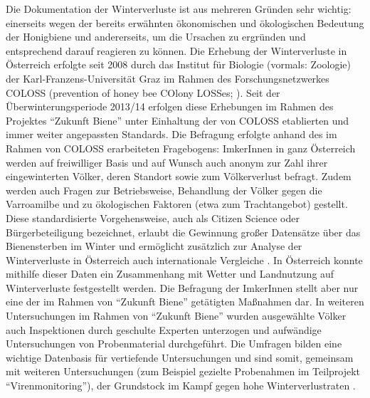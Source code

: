 Die Dokumentation der Winterverluste ist aus mehreren Gründen sehr wichtig: einerseits wegen der bereits erwähnten ökonomischen und ökologischen Bedeutung der Honigbiene und andererseits, um die Ursachen zu ergründen und entsprechend darauf reagieren zu können. Die Erhebung der Winterverluste in Österreich erfolgte seit 2008 durch das Institut für Biologie (vormals: Zoologie) der Karl-Franzens-Universität Graz im Rahmen des Forschungsnetzwerkes COLOSS (prevention of honey bee COlony LOSSes; \cite{brodschneider2010,brodschneider2013}). Seit der Überwinterungsperiode 2013/14 erfolgen diese Erhebungen im Rahmen des Projektes \enquote{Zukunft Biene} unter Einhaltung der von COLOSS etablierten und immer weiter angepassten Standards. Die Befragung erfolgte anhand des im Rahmen von COLOSS erarbeiteten Fragebogens: ImkerInnen in ganz Österreich werden auf freiwilliger Basis und auf Wunsch auch anonym zur Zahl ihrer eingewinterten Völker, deren Standort sowie zum Völkerverlust befragt. Zudem werden auch Fragen zur Betriebsweise, Behandlung der Völker gegen die Varroamilbe und zu ökologischen Faktoren (etwa zum Trachtangebot) gestellt. Diese standardisierte Vorgehensweise, auch als Citizen Science oder Bürgerbeteiligung bezeichnet, erlaubt die Gewinnung großer Datensätze über das Bienensterben im Winter und ermöglicht zusätzlich zur Analyse der Winterverluste in Österreich auch internationale Vergleiche \citep{brodschneider2016, brodschneider2018,brodschneider2019}. In Österreich konnte mithilfe dieser Daten ein Zusammenhang mit Wetter \citep{switanek2017} und Landnutzung \citep{kuchling2018} auf Winterverluste festgestellt werden. Die Befragung der ImkerInnen stellt aber nur eine der im Rahmen von \enquote{Zukunft Biene} getätigten Maßnahmen dar. In weiteren Untersuchungen im Rahmen von \enquote{Zukunft Biene} wurden ausgewählte Völker auch Inspektionen durch geschulte Experten unterzogen und aufwändige Untersuchungen von Probenmaterial durchgeführt. Die Umfragen bilden eine wichtige Datenbasis für vertiefende Untersuchungen und sind somit, gemeinsam mit weiteren Untersuchungen (zum Beispiel gezielte Probenahmen im Teilprojekt \enquote{Virenmonitoring}), der Grundstock im Kampf gegen hohe Winterverlustraten \citep{vanderzee2015}.
